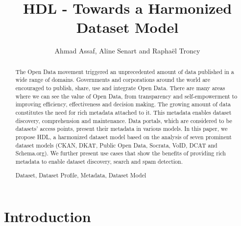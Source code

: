\documentclass[runningheads,a4paper]{llncs}
\newcommand{\keywords}[1]{\par\addvspace\baselineskip
\noindent\keywordname\enspace\ignorespaces#1}
\begin{document}
\title{HDL - Towards a Harmonized Dataset Model}

\author{Ahmad Assaf, Aline Senart and Rapha\"{e}l Troncy }



\maketitle


\begin{abstract}

The Open Data movement triggered an unprecedented amount of data published in a wide range of domains. Governments and corporations around the world are encouraged to publish, share, use and integrate Open Data. There are many areas where we can see the value of Open Data, from transparency and self-empowerment to improving efficiency, effectiveness and decision making. The growing amount of data constitutes the need for rich metadata attached to it. This metadata enables dataset discovery, comprehension and maintenance. Data portals, which are considered to be datasets' access points, present their metadata in various models. In this paper, we propose HDL, a harmonized dataset model based on the analysis of seven prominent dataset models (CKAN, DKAT, Public Open Data, Socrata, VoID, DCAT and Schema.org). We further present use cases that show the benefits of providing rich metadata to enable dataset discovery, search and spam detection.

\keywords{Dataset, Dataset Profile, Metadata, Dataset Model}
\end{abstract}


\section{Introduction}
\label{sec:introduction}
\end{document}
